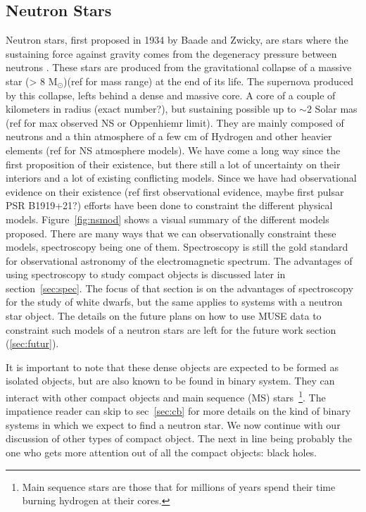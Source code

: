 
\subsection{Neutron Stars}\label{sec:ns}

Neutron stars, first proposed in 1934 by Baade and Zwicky,  are stars where the sustaining force against gravity comes from  the degeneracy pressure between neutrons \citep{baade_cosmic_1934}. These stars are produced from the gravitational collapse of a massive star (> 8 M$_\odot$)(ref for mass range) at the end of its life. The supernova produced by this collapse, lefts behind a dense and massive core. A core of a couple of kilometers in radius (exact number?), but sustaining possible up to $\sim 2$ Solar mas (ref for max observed NS or Oppenhiemr limit). They are mainly  composed of neutrons and a thin atmosphere of a few cm of Hydrogen and other heavier elements (ref for NS atmosphere models). We have come a long way since the first proposition of their existence, but there still a lot of  uncertainty on their interiors and a lot of existing conflicting models. Since we have had observational evidence on their existence (ref first observational evidence, maybe first pulsar PSR B1919+21?) efforts have been done to constraint the different physical models. Figure~\ref{fig:nsmod} shows a visual summary of the different models proposed. There are many ways that we can observationally constraint these models, spectroscopy being one of them. Spectroscopy is still the gold standard for observational astronomy of the electromagnetic spectrum. The advantages of using spectroscopy to study compact objects is discussed later in section~\ref{sec:spec}. The focus of that section is on the advantages of spectroscopy for the study of white dwarfs, but the same applies to systems with a neutron star object. The details on the future plans on how to use MUSE data to constraint such models of a neutron stars are left for the future work section (\ref{sec:futur}).


It is important to note that these dense objects are expected to be formed as isolated objects, but are also known to be found in binary system. They can interact with other compact objects and main sequence (MS) stars~\footnote{Main sequence stars are those that for millions of years spend their time burning hydrogen at their cores.}. The impatience reader can skip to sec~\ref{sec:cb} for more details on the kind of binary systems in which we expect to find a neutron star. We now continue with our discussion of other types of compact object. The next in line being probably the one who gets more attention out of all the compact objects: black holes.


